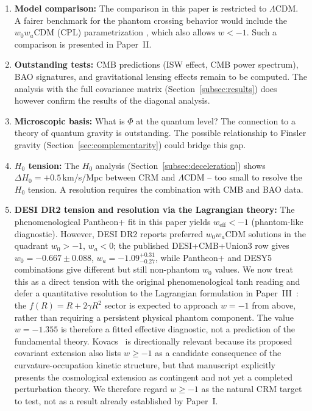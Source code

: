 \documentclass[aps,prd,twocolumn,superscriptaddress,nofootinbib]{revtex4-2}
\begin{document}
\begin{enumerate}
\item \textbf{Model comparison:} The comparison in this paper is restricted to $\Lambda$CDM. A fairer benchmark for the phantom crossing behavior would include the $w_0w_a$CDM (CPL) parametrization \cite{Chevallier2001, Linder2003}, which also allows $w < -1$. Such a comparison is presented in Paper~II.
\item \textbf{Outstanding tests:} CMB predictions (ISW effect, CMB power spectrum), BAO signatures, and gravitational lensing effects remain to be computed. The analysis with the full covariance matrix (Section~\ref{subsec:results}) does however confirm the results of the diagonal analysis.
\item \textbf{Microscopic basis:} What is $\Phi$ at the quantum level? The connection to a theory of quantum gravity is outstanding. The possible relationship to Finsler gravity (Section~\ref{sec:complementarity}) could bridge this gap.
\item \textbf{$H_0$ tension:} The $H_0$ analysis (Section~\ref{subsec:deceleration}) shows $\Delta H_0 = +0.5\,$km/s/Mpc between CRM and $\Lambda$CDM -- too small to resolve the $H_0$ tension. A resolution requires the combination with CMB and BAO data.
\item \textbf{DESI DR2 tension and resolution via the Lagrangian theory:} The phenomenological Pantheon+ fit in this paper yields $w_{\mathrm{eff}} < -1$ (phantom-like diagnostic). However, DESI DR2 \cite{DESI2025} reports preferred $w_0w_a$CDM solutions in the quadrant $w_0>-1$, $w_a<0$; the published DESI+CMB+Union3 row gives $w_0=-0.667\pm0.088$, $w_a=-1.09^{+0.31}_{-0.27}$, while Pantheon+ and DESY5 combinations give different but still non-phantom $w_0$ values. We now treat this as a direct tension with the original phenomenological tanh reading and defer a quantitative resolution to the Lagrangian formulation in Paper~III~\cite{Geiger2026c}: the $f(R) = R + 2\gamma R^2$ sector is expected to approach $w=-1$ from above, rather than requiring a persistent physical phantom component. The value $w=-1.355$ is therefore a fitted effective diagnostic, not a prediction of the fundamental theory. Kovacs~\cite{Kovacs2026} is directionally relevant because its proposed covariant extension also lists $w\geq -1$ as a candidate consequence of the curvature-occupation kinetic structure, but that manuscript explicitly presents the cosmological extension as contingent and not yet a completed perturbation theory. We therefore regard $w\geq -1$ as the natural CRM target to test, not as a result already established by Paper~I.
\end{enumerate}
\end{document}
